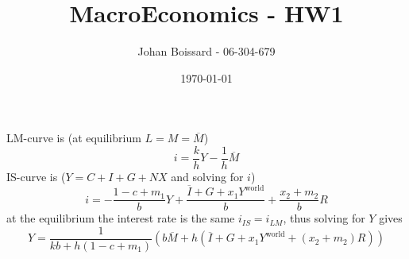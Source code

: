 \documentclass[a4paper] {scrartcl}
\author{Johan Boissard - 06-304-679}
\date{\today}
\title{MacroEconomics - HW1}
\begin{document}
\maketitle


\section{ }
\subsection{ }
LM-curve is (at equilibrium $L=M=\overline M$)
\begin{equation}
	i = \frac{k}{h}Y-\frac{1}{h}\overline M
\end{equation}
IS-curve is ($Y = C+I+G+NX$ and solving for $i$)
\begin{equation}
	i = -\frac{1-c+m_1}{b}Y+ \frac{\overline I + G + x_1Y^{\text{world}}}{b}+\frac{x_2+m_2}{b}R
\end{equation}
at the equilibrium the interest rate is the same $i_{IS} = i_{LM}$, thus solving for $Y$ gives
\begin{equation}
	Y = %
	\frac{1}{kb+h(1-c+m_1)}
			\left(b\overline M+h
				\left(\overline I+G+x_1Y^{\text{world}}+(x_2+m_2)R\right)
			\right)
\end{equation}

\subsection{ }
\end{document}
